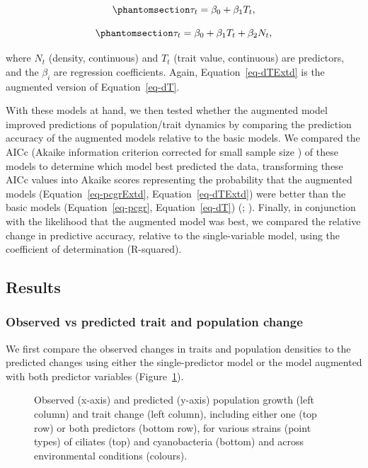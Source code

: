 \documentclass[
  letterpaper,
  DIV=11,
  numbers=noendperiod]{scrartcl}
\begin{document}
\begin{equation}\phantomsection\label{eq-dT}{
\tau_t = \beta_0 + \beta_1 T_t,
}\end{equation}

\begin{equation}\phantomsection\label{eq-dTExtd}{
\tau_t = \beta_0 + \beta_1 T_t + \beta_2 N_t,
}\end{equation}

where \(N_t\) (density, continuous) and \(T_t\) (trait value,
continuous) are predictors, and the \(\beta_i\) are regression
coefficients. Again, Equation~\ref{eq-dTExtd} is the augmented version
of Equation~\ref{eq-dT}.

With these models at hand, we then tested whether the augmented model
improved predictions of population/trait dynamics by comparing the
prediction accuracy of the augmented models relative to the basic
models. We compared the AICc (Akaike information criterion corrected for
small sample size )
of these models to determine which model best predicted the data,
transforming these AICc values into Akaike scores representing the
probability that the augmented models (Equation~\ref{eq-pcgrExtd},
Equation~\ref{eq-dTExtd}) were better than the basic models
(Equation~\ref{eq-pcgr}, Equation~\ref{eq-dT})
(;
). Finally, in
conjunction with the likelihood that the augmented model was best, we
compared the relative change in predictive accuracy, relative to the
single-variable model, using the coefficient of determination
(R-squared).

\subsection{Results}\label{sec-DAE_results}

\subsubsection{Observed vs predicted trait and population
change}\label{observed-vs-predicted-trait-and-population-change}

We first compare the observed changes in traits and population densities
to the predicted changes using either the single-predictor model or the
model augmented with both predictor variables
(Figure~\ref{fig-growth-dtrait}).

\begin{figure}


\caption{\label{fig-growth-dtrait}Observed (x-axis) and predicted
(y-axis) population growth (left column) and trait change (left column),
including either one (top row) or both predictors (bottom row), for
various strains (point types) of ciliates (top) and cyanobacteria
(bottom) and across environmental conditions (colours).}

\end{figure}%
\end{document}
